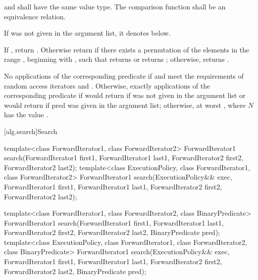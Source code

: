 \begin{itemdescr}
\pnum
\requires {} and  shall have the same
value type. The comparison function shall be an equivalence relation.

\pnum
\remarks If  was not given in the argument list, it denotes
 below.

\pnum
\returns If , return .
Otherwise return  if there exists a permutation of the elements in the
range , beginning with , such that  returns  or
 returns ; otherwise, returns
.

\pnum
\complexity No applications of the corresponding predicate if 
and  meet the requirements of random access iterators and
.
Otherwise, exactly  applications of the
corresponding predicate if 
would return  if  was not given in the argument list
or  would return  if pred was given in the argument list; otherwise, at
worst , where $N$ has the value .
\end{itemdescr}

[alg.search]{Search}

%
\begin{itemdecl}
template<class ForwardIterator1, class ForwardIterator2>
  ForwardIterator1
    search(ForwardIterator1 first1, ForwardIterator1 last1,
           ForwardIterator2 first2, ForwardIterator2 last2);
template<class ExecutionPolicy, class ForwardIterator1, class ForwardIterator2>
  ForwardIterator1
    search(ExecutionPolicy&& exec,
           ForwardIterator1 first1, ForwardIterator1 last1,
           ForwardIterator2 first2, ForwardIterator2 last2);

template<class ForwardIterator1, class ForwardIterator2,
         class BinaryPredicate>
  ForwardIterator1
    search(ForwardIterator1 first1, ForwardIterator1 last1,
           ForwardIterator2 first2, ForwardIterator2 last2,
           BinaryPredicate pred);
template<class ExecutionPolicy, class ForwardIterator1, class ForwardIterator2,
         class BinaryPredicate>
  ForwardIterator1
    search(ExecutionPolicy&& exec,
           ForwardIterator1 first1, ForwardIterator1 last1,
           ForwardIterator2 first2, ForwardIterator2 last2,
           BinaryPredicate pred);
\end{itemdecl}

